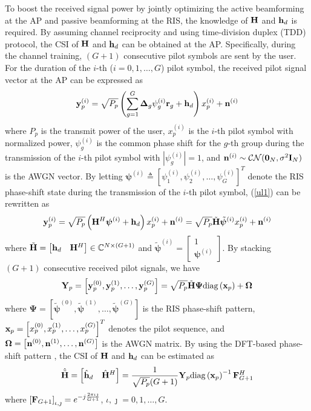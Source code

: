 \documentclass[draftclsnofoot,onecolumn,12pt]{IEEEtran}
\begin{document}
	To boost the received signal power by jointly optimizing the active beamforming at the AP and passive beamforming at the RIS, the knowledge of $\bf H$ and ${\bf h}_d$ is required. 
	By assuming channel reciprocity and using time-division duplex (TDD) protocol, 
	the CSI of $\bf H$ and ${\bf h}_d$ can be obtained at the AP. 
Specifically, during the channel training, $(G+1)$ consecutive pilot symbols are sent by the user. 
	For the duration of the $i$-th ($i=0,1,\ldots,G$) pilot symbol, the received pilot signal vector at the AP can be expressed as
	\begin{align}
		{\bf y}_p^{(i)}=\sqrt{P_p}\left(\sum_{g=1}^{G} {\bm \Delta}_{g} { \psi}_g^{(i)}  {\bf r}_{g}+{\bf h}_d\right) { x_p^{(i)}}+{\bf n}^{(i)}\label{ul1}
		\end{align}
	where $P_p$ is the transmit power of the user, $x_p^{(i)}$ is the $i$-th pilot symbol with normalized power, ${ \psi}_g^{(i)}$ is the common phase shift for the $g$-th group during the transmission of the $i$-th pilot symbol with $|{ \psi}_g^{(i)}|=1$, and ${\bf n}^{(i)}\sim \mathcal{CN}( {\bf 0}_N,\sigma^2{\bf I}_N)$ is the AWGN vector. 
	By letting ${\bm \psi}^{(i)}\triangleq \left[{ \psi}_1^{(i)}, { \psi}_2^{(i)},\ldots, { \psi}_G^{(i)}   \right]^T$ denote the RIS phase-shift state during the transmission of the $i$-th pilot symbol, (\ref{ul1}) can be rewritten as
		\begin{align}
		{\bf y}_p^{(i)}=\sqrt{P_p}\left({\bf H}^H {\bm \psi}^{(i)}  +{\bf h}_d\right) { x_p^{(i)}}+{\bf n}^{(i)}
		= \sqrt{P_p}\tilde{\bf H}\tilde{\bm \psi}^{(i)}{ x_p^{(i)}}+{\bf n}^{(i)}
		\end{align}
		where $\tilde{\bf H}=\left[{\bf h}_d\quad{\bf H}^H\right]\in\mathbb{C}^{N \times (G+1)}$ and $\tilde{\bm \psi}^{(i)}=\left[ {\begin{array}{*{20}{c}}
			{1}\\
			{{\bm \psi}^{(i)}}
			\end{array}} \right]$. 
		By stacking $(G+1)$ consecutive received pilot signals, we have
		\begin{align}
		{\bf Y}_p=\left[{\bf y}_p^{(0)},{\bf y}_p^{(1)},\ldots,{\bf y}_p^{(G)}\right]=\sqrt{P_p}\tilde{{\bf H}} {{\bm \Psi}}\text{diag}\left( {\bf x}_p \right) +{\bf \Omega}\label{CE}
		\end{align}
		where ${\bm \Psi}=\left[\tilde{\bm \psi}^{(0)},\tilde{\bm \psi}^{(1)},\ldots,\tilde{\bm \psi}^{(G)}\right]$ is the RIS phase-shift pattern, ${\bf x}_p=\left[x_p^{(0)},x_p^{(1)},\ldots,x_p^{(G)}\right]^T$ denotes the pilot sequence, and ${\bf \Omega}=\left[{\bf n}^{(0)},{\bf n}^{(1)},\ldots,{\bf n}^{(G)}\right]$ is the AWGN matrix. 
		By using the DFT-based phase-shift pattern \cite{Tobias2019An}, the CSI of $\bf H$ and ${\bf h}_d$ can be estimated as
		\begin{align}\label{estimate}
		\hat{\tilde{{\bf H}}}=\left[\hat{{\bf h}}_d\quad\hat{{\bf H}}^H\right]=\frac{1}{\sqrt{P_p}(G+1)}{\bf Y}_p \text{diag}\left( {\bf x}_p \right)^{-1}{\bf F}_{G+1}^H
		\end{align}
		where $\left[{\bf F}_{G+1}\right]_{\iota,\jmath}=e^{-j\frac{2\pi\iota\jmath}{G+1}}$, $\iota,\jmath=0,1,\ldots,G$. 
			
\end{document}
